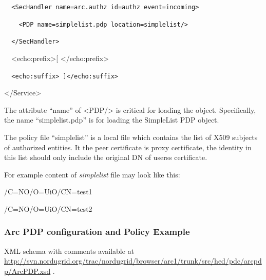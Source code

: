 \documentclass{article}
\begin{document}
{\upshape\color{black}
\foreignlanguage{spanish}{\texttt{\ \ }}\texttt{{\textless}SecHandler
name={\textquotedbl}arc.authz{\textquotedbl}
id={\textquotedbl}authz{\textquotedbl}
event={\textquotedbl}incoming{\textquotedbl}{\textgreater}}}

{\upshape\color{black}
\texttt{\ \ \ \ {\textless}PDP
name={\textquotedbl}}\texttt{simplelist}\texttt{.pdp{\textquotedbl}}\texttt{
location=}\texttt{{\textquotedbl}}\texttt{simplelist}\texttt{{\textquotedbl}}\texttt{/}\texttt{{\textgreater}}}

{\upshape\color{black}
\texttt{\ \ }\foreignlanguage{spanish}{\texttt{{\textless}/SecHandler{\textgreater}}}}

{\ttfamily\color{black}
\ \ {\textless}echo:prefix{\textgreater}[
{\textless}/echo:prefix{\textgreater}}

{\upshape\color{black}
\foreignlanguage{spanish}{\texttt{\ \ }}\texttt{{\textless}echo:suffix{\textgreater}
]{\textless}/echo:suffix{\textgreater}}}

{\ttfamily\color{black}
{\textless}/Service{\textgreater}}

{\color{black}
The attribute {\textquotedblleft}name{\textquotedblright} of
{\textless}PDP/{\textgreater} is critical for loading the object.
Specifically, the name
{\textquotedblleft}simplelist.pdp{\textquotedblright} is for loading
the SimpleList PDP object.}

{\upshape\color{black}
The policy file {\textquotedblleft}simplelist{\textquotedblright} is a
local file which contains the list of X509 subjects of authorized
entities. It the peer certificate is proxy certificate, the identity in
this list should only include the original DN of
users{\textquotesingle}s certificate.}

{\upshape\color{black}
For example content of \textit{simplelist} file may look like this:}

{\color{black}
/C=NO/O=UiO/CN=test1}

{\color{black}
/C=NO/O=UiO/CN=test2}

\subsubsection[Arc PDP configuration and Policy Example]{Arc PDP
configuration and Policy Example}
\label{bkm:Ref204009974}{\upshape\color{black}
XML schema with comments available at
\url{http://svn.nordugrid.org/trac/nordugrid/browser/arc1/trunk/src/hed/pdc/arcpdp/ArcPDP.xsd}
.}
\end{document}
